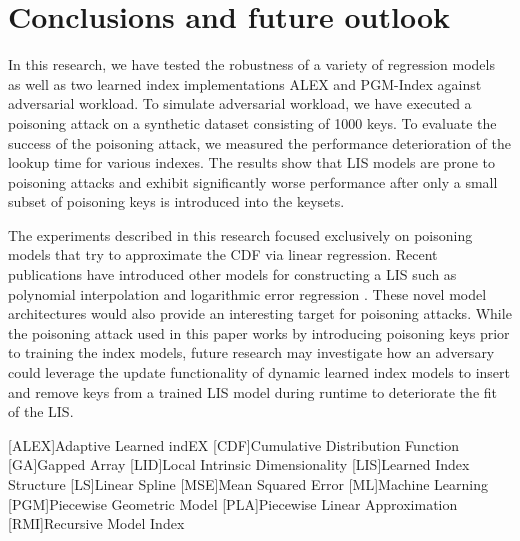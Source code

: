 \documentclass[sigconf]{acmart}
\begin{document}

 

\section{Conclusions and future outlook}

In this research, we have tested the robustness of a variety of regression models as well as two learned index implementations \ac{ALEX} and \ac{PGM}-Index against adversarial workload. To simulate adversarial workload, we have executed a poisoning attack on a synthetic dataset consisting of 1000 keys.
To evaluate the success of the poisoning attack, we measured the performance deterioration of the lookup time for various indexes. The results show that \ac{LIS} models are prone to poisoning attacks and exhibit significantly worse performance after only a small subset of poisoning keys is introduced into the keysets.


The experiments described in this research focused exclusively on poisoning models that try to approximate the \ac{CDF} via linear regression. Recent publications have introduced other models for constructing a \ac{LIS} such as polynomial interpolation \cite{RN408} and logarithmic error regression \cite{RN696}. These novel model architectures would also provide an interesting target for poisoning attacks.
While the poisoning attack used in this paper works by introducing poisoning keys prior to training the index models, future research may investigate how an adversary could leverage the update functionality of dynamic learned index models to insert and remove keys from a trained \ac{LIS} model during runtime to deteriorate the fit of the \ac{LIS}.




\begin{acronym}
	[ALEX]{Adaptive Learned indEX}
	[CDF]{Cumulative Distribution Function}
	[GA]{Gapped Array}
	[LID]{Local Intrinsic Dimensionality}
	[LIS]{Learned Index Structure}
	[LS]{Linear Spline}
	[MSE]{Mean Squared Error}
	[ML]{Machine Learning}
	[PGM]{Piecewise Geometric Model}
	[PLA]{Piecewise Linear Approximation}
	[RMI]{Recursive Model Index}
\end{acronym}
\end{document}
